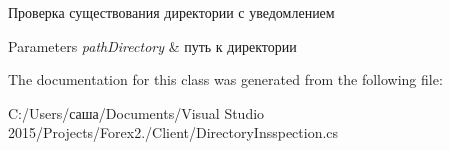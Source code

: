 Проверка существования директории с уведомлением 


\begin{DoxyParams}{Parameters}
{\em path\+Directory} & путь к директории\\
\hline
\end{DoxyParams}


The documentation for this class was generated from the following file\+:\begin{DoxyCompactItemize}
\item 
C\+:/\+Users/саша/\+Documents/\+Visual Studio 2015/\+Projects/\+Forex2./\+Client/Directory\+Insspection.\+cs\end{DoxyCompactItemize}
